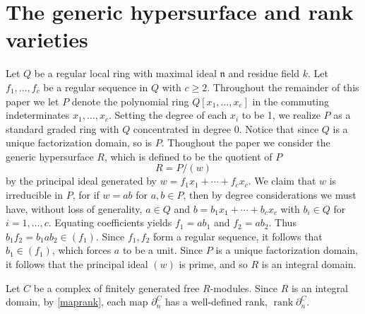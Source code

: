 \documentclass{amsart}[11pt]
\newcommand{\n}{{\mathfrak n}}
\newcommand{\rank}{\operatorname{rank}}
\newcommand{\Ktac}{\operatorname{\mathsf{K}_{tac}}\nolimits}
\numberwithin{equation}{section}
\theoremstyle{plain}
\newtheorem*{Main Theorem}{Main Theorem}
\theoremstyle{definition}
\newtheorem{chunk}[theorem]{}
\theoremstyle{remark}
\numberwithin{equation}{theorem}
\begin{document}













\section{The generic hypersurface and rank varieties}\label{sec:3}

Let $Q$ be a regular local ring with maximal ideal $\n$ and residue
field $k$. Let $f_1,\dots,f_c$ be a regular sequence in $Q$ with $c\ge 2$.
Throughout the remainder of this paper we let $P$ denote the polynomial ring $Q[x_1,\dots,x_c]$
in the commuting indeterminates $x_1,\dots,x_c$. Setting the degree of each $x_i$ to be 1, we realize $P$ as a standard graded ring with $Q$ concentrated in degree 0. Notice that since $Q$ is a unique factorization domain, so is $P$. Thoughout the paper we consider the generic hypersurface $R$, which is defined to be the quotient of $P$
\[
R = P/(w)
\]
by the principal ideal generated by $w=f_1x_1+\cdots +f_cx_c$.  We claim that $w$ is irreducible in 
$P$, for if $w=ab$ for $a,b\in P$, then by degree considerations we must have, without loss of generality, 
$a\in Q$ and $b=b_1x_1+\cdots+b_cx_c$ with $b_i\in Q$ for $i=1,\dots,c$.  Equating coefficients yields 
$f_1=ab_1$ and $f_2=ab_2$. Thus $b_1f_2=b_1ab_2\in(f_1)$. Since $f_1,f_2$ form a regular sequence, it follows that $b_1\in(f_1)$, which forces $a$ to be a unit.  Since $P$ is a unique factorization domain, it follows that the principal ideal $(w)$ is prime, and so $R$ is an integral domain.

Let $C$ be a complex of finitely generated free $R$-modules.  Since $R$ is an integral domain, 
by \ref{maprank}, each map $\partial_n^C$ has a well-defined rank, $\rank\partial_n^C$.
\end{document}
